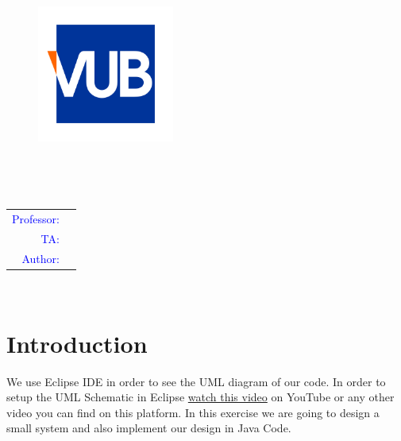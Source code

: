 \documentclass[12pt , a4paper]{article}
\newcommand{\assignmentNumber}{}
\newcommand{\assignmentName}{}
\newcommand{\courseProfessor}{}
\newcommand{\taName}{}
\newcommand{\writingMonth}{}
\begin{document}
%
%
\thispagestyle{empty}
 \begin{center}


\begin{figure}[H]
\centering
\includegraphics[width=0.4\textwidth]{VUB_Logo.jpg}
\caption*{}
\label{f-0-0}
\end{figure}
{
\centering
{}  
\fontsize{18pt}{18pt}
\selectfont 
\assignmentName
}
\\[20pt]
{
\centering
{}  
\fontsize{16pt}{16pt}
\selectfont 
\assignmentNumber
}
\\[20pt]
{
\centering
{}  
\fontsize{12pt}{12pt}
\selectfont 
\begin{tabular}{r l}
\textcolor{blue}{Professor:}			&	\courseProfessor\\[7pt]
\textcolor{blue}{TA:}				&	\taName\\[7pt]
\textcolor{blue}{Author:}

\end{tabular}
}
\\[20pt]
{
\centering
{}  
\fontsize{12pt}{12pt}
\selectfont 
\writingMonth
}

\end{center}
 

 
\setmainfont{Times New Roman}
\newpage

%
%
\tableofcontents
\newpage


%
%
\section{Introduction}
We use Eclipse IDE in order to see the UML diagram of our code. In order to setup the UML Schematic in Eclipse \href{https://youtu.be/0Zlh56mTS6c}{watch this video} on YouTube or any other video you can find on this platform. In this exercise we are going to design a small system and also implement our design in Java Code.
\end{document}
